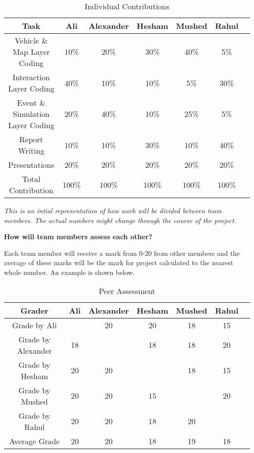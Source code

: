 \begin{table}[h!]
\centering
\begin{tabular}{ |c|c|c|c|c|c|c| } 
\hline
Task & Ali & Alexander & Hesham & Mushed & Rahul\\
\hline
Vehicle \& Map Layer Coding & 10\% & 20\% & 30\% & 40\% & 5\%\\
\hline
Interaction Layer Coding & 40\% & 10\% & 10\% & 5\% & 30\%\\
\hline
Event \& Simulation Layer Coding & 20\% & 40\% & 10\% & 25\% & 5\%\\ 
\hline
Report Writing& 10\% & 10\% & 30\% & 10\% & 40\%\\
\hline
Presentations & 20\% & 20\% & 20\% & 20\% & 20\%\\
\hline
Total Contribution & 100\% & 100\% & 100\% & 100\% & 100\%\\
\hline
\end{tabular}
\caption{Individual Contributions}
\label{table:1}
\end{table}

\noindent \textit{This is an intial representation of how work will be divided between team members. The actual numbers might change through the course of the project.}

\clearpage


\vspace{1em}
\noindent \textbf{How will team members assess each other?}

\vspace{1em}
\noindent Each team member will receive a mark from 0-20 from other members and the average of these marks will be the mark for project calculated to the nearest whole number. An example is shown below. 

\begin{table}[ht]
\centering
\begin{tabular}{ |c|c|c|c|c|c|c| } 
\hline
Grader & Ali & Alexander & Hesham & Mushed & Rahul\\
\hline
Grade by Ali & \-&20&20&18&15\\
\hline
Grade by Alexander & 18&\-&18&18&20\\
\hline
Grade by Hesham & 20&20&\-&18&15\\
\hline
Grade by Mushed& 20&20&15&\-&20\\
\hline
Grade by Rahul & 20&20&18&20&\-\\
\hline
Average Grade & 20&20&18&19&18\\
\hline
\end{tabular}
\caption{Peer Assessment}
\label{table:1}
\end{table}


